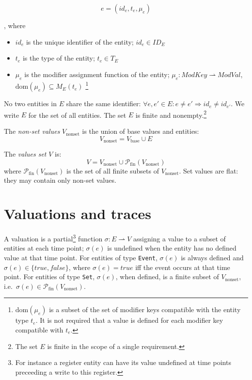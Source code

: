 \begin{definition}[Entity]\label{def:entity}
    \[
        e = (id_e, t_e, \mu_e)
    \]

    , where
    \begin{itemize}
        \item $id_e$ is the unique identifier of the entity; $id_e \in \mathit{ID}_E$
        \item $t_e$ is the type of the entity; $t_e \in T_E$
        \item $\mu_e$ is the modifier assignment function of the entity; $\mu_e : \mathit{ModKey} \rightharpoonup \mathit{ModVal}$, $\mathrm{dom}(\mu_e) \subseteq M_E(t_e)$ \footnote{$\mathrm{dom}(\mu_e)$ is a subset of the set of modifier keys compatible with the entity type $t_e$. It is not required that a value is defined for each modifier key compatible with $t_e$.}
    \end{itemize}
    No two entities in $E$ share the same identifier: $\forall e, e' \in E: e \neq e' \Rightarrow id_e \neq id_{e'}$.
    We write $E$ for the set of all entities. The set $E$ is finite and nonempty.\footnote{The set $E$ is finite in the scope of a single requirement.}
\end{definition}

\begin{definition}\label{def:nonset_values}
    The \emph{non-set values} $V_{\text{nonset}}$ is the union of base values and entities:
    \[
        V_{\text{nonset}} = V_{\text{base}} \cup E
    \]
\end{definition}

\begin{definition}[Values]\label{def:values}
    The \emph{values set} $V$ is:
    \[
        V = V_{\text{nonset}} \cup \mathcal{P}_{\text{fin}}(V_{\text{nonset}})
    \]
    where $\mathcal{P}_{\text{fin}}(V_{\text{nonset}})$ is the set of all finite subsets of $V_{\text{nonset}}$.
    Set values are flat: they may contain only non-set values.
\end{definition}

\section{Valuations and traces}

\begin{definition}[Valuation]\label{def:valuation}
    A valuation is a partial\footnote{For instance a register entity can have its value undefined at time points preceeding a write to this register.} function $\sigma : E \rightharpoonup V$ assigning a value to a subset of entities at each time point; $\sigma(e)$ is undefined when the entity has no defined value at that time point.
    For entities of type \texttt{Event}, $\sigma(e)$ is always defined and $\sigma(e) \in \{\mathit{true}, \mathit{false}\}$,
    where $\sigma(e) = \mathit{true}$ iff the event occurs at that time point.
    For entities of type \texttt{Set}, $\sigma(e)$, when defined, is a finite subset of $V_{\text{nonset}}$, i.e.\ $\sigma(e) \in \mathcal{P}_{\text{fin}}(V_{\text{nonset}})$.
\end{definition}

